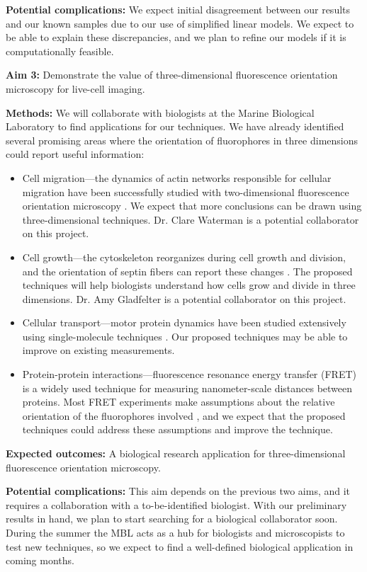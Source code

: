 \documentclass[11pt]{article}
\begin{document}
\noindent\textbf{Potential complications:} We expect initial disagreement
between our results and our known samples due to our use of simplified linear
models. We expect to be able to explain these discrepancies, and we plan to
refine our models if it is computationally feasible.

\noindent\textbf{Aim 3:} Demonstrate the value of three-dimensional fluorescence
  orientation microscopy for live-cell imaging.

\noindent\textbf{Methods:} We will collaborate with biologists at the Marine
Biological Laboratory to find applications for our techniques. We have already
identified several promising areas where the orientation of fluorophores in
three dimensions could report useful information:
\begin{itemize}
\item Cell migration---the dynamics of actin networks responsible for cellular
  migration have been successfully studied with two-dimensional fluorescence
  orientation microscopy \cite{swam}. We expect that more conclusions can be
  drawn using three-dimensional techniques. Dr. Clare Waterman is a potential
  collaborator on this project.
\item Cell growth---the cytoskeleton reorganizes during cell growth and
  division, and the orientation of septin fibers can report these changes
  \cite{mehta2016}. The proposed techniques will help biologists understand how
  cells grow and divide in three dimensions. Dr. Amy Gladfelter is a potential
  collaborator on this project.
\item Cellular transport---motor protein dynamics have been studied extensively
  using single-molecule techniques \cite{toprak2006}. Our proposed techniques
  may be able to improve on existing measurements.
\item Protein-protein interactions---fluorescence resonance energy transfer
  (FRET) is a widely used technique for measuring nanometer-scale distances
  between proteins. Most FRET experiments make assumptions about the relative
  orientation of the fluorophores involved \cite{nov2006}, and we expect that the
  proposed techniques could address these assumptions and improve the technique.
\end{itemize}

\noindent\textbf{Expected outcomes:} A biological research application for
three-dimensional fluorescence orientation microscopy. 

\noindent\textbf{Potential complications:} This aim depends on the previous two
aims, and it requires a collaboration with a to-be-identified biologist. With
our preliminary results in hand, we plan to start searching for a biological
collaborator soon. During the summer the MBL acts as a hub for biologists and
microscopists to test new techniques, so we expect to find a well-defined
biological application in coming months.
\end{document}
